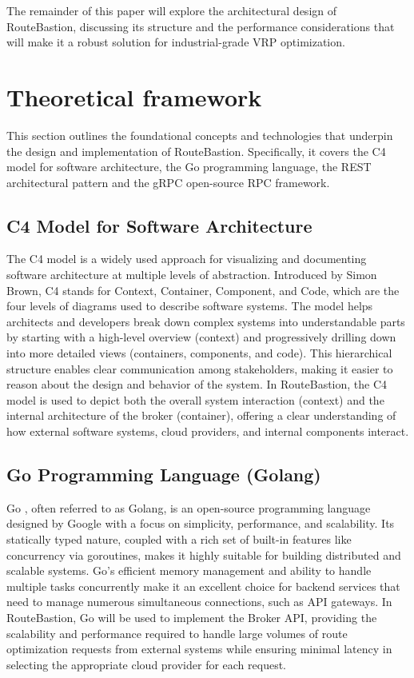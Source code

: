 \documentclass[english,notblind]{sbc20}
\begin{document}
The remainder of this paper will explore the architectural design of RouteBastion, discussing its structure and the performance considerations that will make it a robust solution for industrial-grade VRP optimization.

\section{Theoretical framework}
\label{sec:theoretical_framework}

This section outlines the foundational concepts and technologies that underpin the design and implementation of RouteBastion. Specifically, it covers the C4 model for software architecture, the Go programming language, the REST architectural pattern and the gRPC open-source RPC framework.

\subsection{C4 Model for Software Architecture}
\label{subsec:c4_model_for_software_architecture}
The C4 model \cite{c4model} is a widely used approach for visualizing and documenting software architecture at multiple levels of abstraction. Introduced by Simon Brown, C4 stands for Context, Container, Component, and Code, which are the four levels of diagrams used to describe software systems. The model helps architects and developers break down complex systems into understandable parts by starting with a high-level overview (context) and progressively drilling down into more detailed views (containers, components, and code). This hierarchical structure enables clear communication among stakeholders, making it easier to reason about the design and behavior of the system. In RouteBastion, the C4 model is used to depict both the overall system interaction (context) and the internal architecture of the broker (container), offering a clear understanding of how external software systems, cloud providers, and internal components interact.

\subsection{Go Programming Language (Golang)}
\label{subsec:go_programming_language}
Go \cite{gopl}, often referred to as Golang, is an open-source programming language designed by Google with a focus on simplicity, performance, and scalability. Its statically typed nature, coupled with a rich set of built-in features like concurrency via goroutines, makes it highly suitable for building distributed and scalable systems. Go’s efficient memory management and ability to handle multiple tasks concurrently make it an excellent choice for backend services that need to manage numerous simultaneous connections, such as API gateways. In RouteBastion, Go will be used to implement the Broker API, providing the scalability and performance required to handle large volumes of route optimization requests from external systems while ensuring minimal latency in selecting the appropriate cloud provider for each request.
\end{document}
